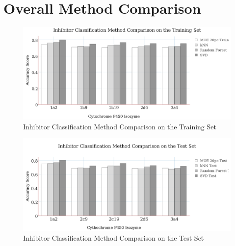 \section{Overall Method Comparison}

\begin{figure}[!htbp]
\includegraphics[width=1\textwidth]{../img/method_comparison_training_set.png}
\caption{Inhibitor Classification Method Comparison on the Training Set}
\end{figure}

\begin{figure}[!htbp]
\includegraphics[width=1\textwidth]{../img/method_comparison_test_set.png}
\caption{Inhibitor Classification Method Comparison on the Test Set}
\end{figure}






